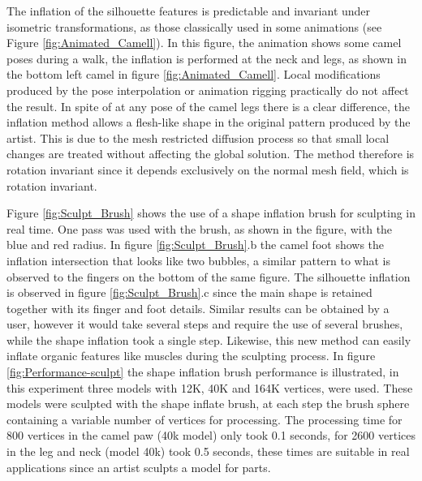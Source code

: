 \documentclass[10pt, conference]{IEEEtran}
\begin{document}
The inflation of the silhouette features is predictable and invariant
under isometric transformations, as those classically used in some
animations (see Figure \ref{fig:Animated_Camell}). In this figure,
the animation shows some camel poses during a walk, the inflation
is performed at the neck and legs, as shown in the bottom left camel
in figure \ref{fig:Animated_Camell}. Local modifications produced
by the pose interpolation or animation rigging practically do not
affect the result. In spite of at any pose of the camel legs there
is a clear difference, the inflation method allows a flesh-like
shape in the original pattern produced by the artist. This is due
to the mesh restricted diffusion process so that small local changes
are treated without affecting the global solution. The method therefore
is rotation invariant since it depends exclusively on the normal mesh
field, which is rotation invariant. 

Figure \ref{fig:Sculpt_Brush} shows the use of a shape inflation
brush for sculpting in real time. One pass was used with the brush,
as shown in the figure, with the blue and red radius. In figure \ref{fig:Sculpt_Brush}.b
the camel foot shows the inflation intersection that looks like two
bubbles, a similar pattern to what is observed to the fingers on the
bottom of the same figure. The silhouette inflation is observed
in figure \ref{fig:Sculpt_Brush}.c since the main shape is retained
together with its finger and foot details. Similar results can be
obtained by a user, however it would take several steps and require
the use of several brushes, while the shape inflation took a single
step. Likewise, this new method can easily inflate organic features
like muscles during the sculpting process. In figure \ref{fig:Performance-sculpt}
the shape inflation brush performance is illustrated, in this experiment
three models with 12K, 40K and 164K vertices, were used. These models
were sculpted with the shape inflate brush, at each step the brush
sphere containing a variable number of vertices for processing. The
processing time for 800 vertices in the camel paw (40k model) only
took 0.1 seconds, for 2600 vertices in the leg and neck (model 40k)
took 0.5 seconds, these times are suitable in real applications since
an artist sculpts a model for parts.
\end{document}
